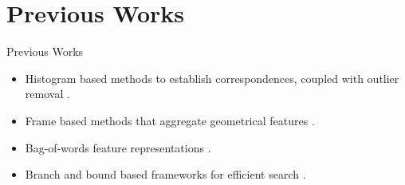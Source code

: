 \section{Previous Works}

\begin{frame}{Previous Works}
\begin{itemize}
    \item Histogram based methods to establish correspondences, coupled with outlier removal \cite{Rusu2009}.
    \item Frame based methods that aggregate geometrical features \cite{Kim2018}.
    \item Bag-of-words feature representations \cite{Cui2023}.
    \item Branch and bound based frameworks for efficient search \cite{Hess2016}.
\end{itemize}
\end{frame}
